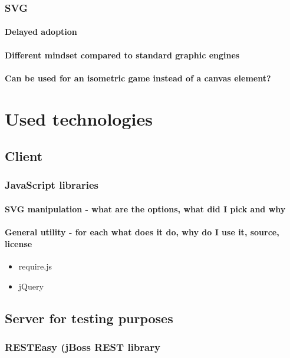 \documentclass[11pt,oneside, final]{fithesis2}
\begin{document}
\subsection{SVG}
\subsubsection{Delayed adoption}
\subsubsection{Different mindset compared to standard graphic engines}

\subsubsection{Can be used for an isometric game instead of a canvas element?}

\chapter{Used technologies}
\section{Client}
\subsection{JavaScript libraries}
\subsubsection{SVG manipulation - what are the options, what did I pick and why}
\subsubsection{General utility - for each what does it do, why do I use it, source, license}
\begin{itemize}
	\item require.js
	\item jQuery
\end{itemize}

\section{Server for testing purposes}
\subsection{RESTEasy (jBoss REST library}
\end{document}
